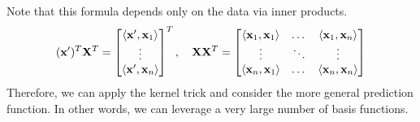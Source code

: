 Note that this formula depends only on the data via inner products. 
\begin{align*}
	({\mathbf{x}}')^T\mathbf{X}^T = 
	\begin{bmatrix}
		\langle {\mathbf{x}}',{\mathbf{x}}_1\rangle\\
		\vdots\\
		\langle {\mathbf{x}}',{\mathbf{x}}_n\rangle
	\end{bmatrix}^T,\quad
	\mathbf{X}\mathbf{X}^T = 
	\begin{bmatrix}
		\langle {\mathbf{x}}_1,{\mathbf{x}}_1\rangle& \dots& \langle {\mathbf{x}}_1,{\mathbf{x}}_n\rangle\\
		\vdots&\ddots&\vdots\\
		\langle {\mathbf{x}}_n,{\mathbf{x}}_1\rangle &\dots &\langle {\mathbf{x}}_n,{\mathbf{x}}_n\rangle
	\end{bmatrix}
\end{align*}
Therefore, we can apply the kernel trick and consider the more general prediction function. In other words, we can leverage a very large number of basis functions. 






